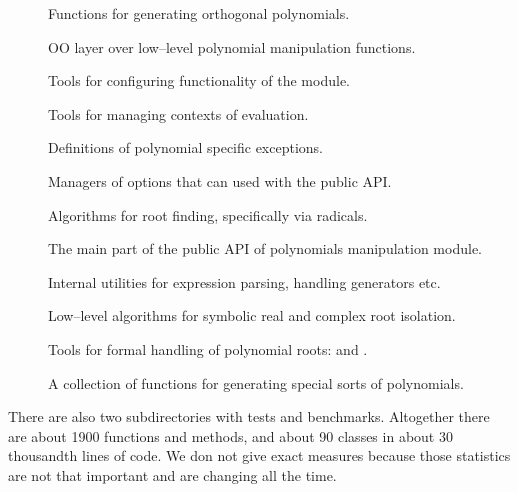 \begin{description}
\item[] \leavevmode
Functions for generating orthogonal polynomials.

\item[] \leavevmode
OO layer over low--level polynomial manipulation functions.

\item[] \leavevmode
Tools for configuring functionality of the module.

\item[] \leavevmode
Tools for managing contexts of evaluation.

\item[] \leavevmode
Definitions of polynomial specific exceptions.

\item[] \leavevmode
Managers of options that can used with the public API.

\item[] \leavevmode
Algorithms for root finding, specifically via radicals.

\item[] \leavevmode
The main part of the public API of polynomials manipulation module.

\item[] \leavevmode
Internal utilities for expression parsing, handling generators etc.

\item[] \leavevmode
Low--level algorithms for symbolic real and complex root isolation.

\item[] \leavevmode
Tools for formal handling of polynomial roots:  and .

\item[] \leavevmode
A collection of functions for generating special sorts of polynomials.

\end{description}

There are also two subdirectories with tests and benchmarks. Altogether there are about 1900
functions and methods, and about 90 classes in about 30 thousandth lines of code. We don not
give exact measures because those statistics are not that important and are changing all the
time.


